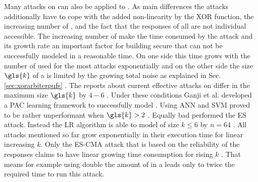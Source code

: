 Many attacks on \apufs can also be applied to \xpufs.
As main differences the attacks additionally have to cope with the added non-linearity by the \ac{XOR} function, the increasing number of \apufs, and the fact that the responses of all \apufs are not individual accessible.
The increasing number of \apufs make the time consumed by the attack and its growth rate an important factor for building secure \xpufs that can not be successfully modeled in a reasonable time.
On one side this time grows with the number of used \apufs for the most attacks exponentially and on the other side the size $\gls{k}$ of a \xpuf is limited by the growing total noise as explained in Sec. \ref{sec:xorarbiterpufs} \cite{Ruhrmair2010ModelingFunctions}.
The reports about current effective attacks on \xpufs differ in the maximum size $\gls{k}$ by $4 - 6$ \cite{Ganji2015WhyPUFs} \cite{Xu2014Hybrid}.
Under these conditions Ganji et al. developed a \ac{PAC} learning framework to successfully model \xpufs \cite{Ganji2015WhyPUFs}.
Using \ac{ANN} and \ac{SVM} proved to be rather unperformant when $\gls{k} > 2$ \cite{Hospodar2012MachineUsability}.
Equally bad performed the \ac{ES} attack.
Instead the \ac{LR} algorithm is able to model \xpufs of size $k \le 6$ by $n = 64$ \cite{Ruhrmair2010ModelingFunctions}.
All attacks mentioned so far grow exponentially in their execution time for linear increasing $k$.
Only the \ac{ES-CMA} attack that is based on the reliability of the responses claims to have linear growing time consumption for rising $k$ \cite{Becker2015ThePUFs}.
That means for example using double the amount of \apufs in a \xpufs leads only to twice the required time to run this attack.


